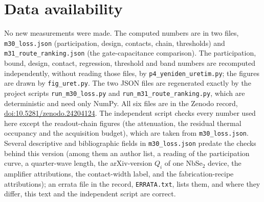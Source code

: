 \documentclass[aps,prb,reprint,superscriptaddress,longbibliography]{revtex4-2}
\newcommand{\zenododoi}{10.5281/zenodo.24204124}
\begin{document}
\section*{Data availability}
{\raggedright
No new measurements were made. The computed numbers are in two files,
\texttt{m30\_loss.json} (participation, design, contacts, chain,
thresholds) and \texttt{m31\_route\_ranking.json} (the gate-capacitance
comparison). The participation, bound, design, contact, regression,
threshold and band numbers are recomputed independently, without reading
those files, by \texttt{p4\_yeniden\_uretim.py}; the figures are drawn by
\texttt{fig\_uret.py}. The two JSON files are regenerated exactly by the
project scripts \texttt{run\_m30\_loss.py} and
\texttt{run\_m31\_route\_ranking.py}, which are deterministic and need
only NumPy. All six files are in the Zenodo record,
\href{https://doi.org/\zenododoi}{doi:\zenododoi}. The independent
script checks every number used here except the readout-chain figures
(the attenuation, the residual thermal occupancy and the acquisition
budget), which are taken from \texttt{m30\_loss.json}. Several descriptive and
bibliographic fields in \texttt{m30\_loss.json} predate the checks behind
this version (among them an author list, a reading of the participation
curve, a quarter-wave length, the arXiv-version $Q_i$ of one NbSe$_2$
device, the amplifier attributions, the contact-width label, and the
fabrication-recipe attributions); an errata file in the record,
\texttt{ERRATA.txt}, lists them, and where they differ, this text and
the independent script are correct.\par}
\end{document}
